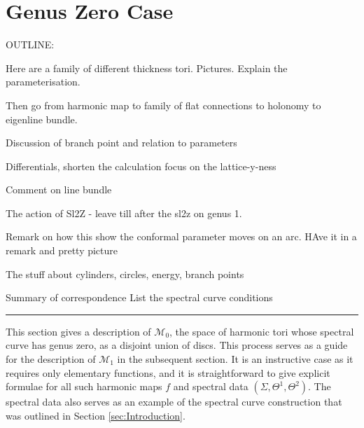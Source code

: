 \documentclass{article}
\begin{document}
\section{Genus Zero Case}
\label{sec:Genus Zero}
OUTLINE:

Here are a family of different thickness tori. Pictures. Explain the parameterisation.

Then go from harmonic map to family of flat connections to holonomy to eigenline bundle.

Discussion of branch point and relation to parameters

Differentials, shorten the calculation focus on the lattice-y-ness

Comment on line bundle

The action of Sl2Z - leave till after the sl2z on genus 1.

Remark on how this show the conformal parameter moves on an arc. HAve it in a remark and pretty picture

The stuff about cylinders, circles, energy, branch points


Summary of correspondence
List the spectral curve conditions

\hrule


This section gives a description of $\mathcal{M}_0$, the space of harmonic tori whose spectral curve has genus zero, as a disjoint union of discs. This process serves as a guide for the description of $\mathcal{M}_1$ in the subsequent section. It is an instructive case as it requires only elementary functions, and it is straightforward to give explicit formulae for all such harmonic maps $f$ and spectral data $(\Sigma,\Theta^1,\Theta^2)$. The spectral data also serves as an example of the spectral curve construction that was outlined in Section \ref{sec:Introduction}. 

\end{document}
